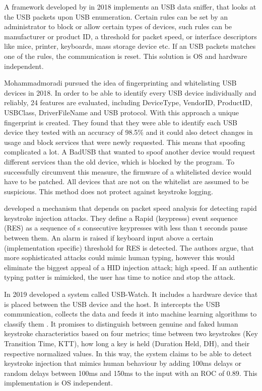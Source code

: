 A framework developed by \cite{erdinOSIndependentHardwareAssisted2018} in 2018 implements an USB data sniffer, that looks at the USB packets upon USB enumeration. Certain rules can be set by an administrator to block or allow certain types of devices, such rules can be manufacturer or product ID, a threshold for packet speed, or interface descriptors like mice, printer, keyboards, mass storage device etc. If an USB packets matches one of the rules, the communication is reset. This solution is OS and hardware independent. 

Mohammadmoradi \cite{mohammadmoradiMakingWhitelistingBasedDefense2018} pursued the idea of fingerprinting and whitelisting USB devices in 2018. In order to be able to identify every USB device individually and reliably, 24 features are evaluated, including DeviceType, VendorID, ProductID, USBClass, DriverFileName and USB protocol. With this approach a unique fingerprint is created. They found that they were able to identify each USB device they tested with an accuracy of 98.5\% and it could also detect changes in usage and block services that were newly requested. This means that spoofing complicated a lot. A BadUSB that wanted to spoof another device would request different services than the old device, which is blocked by the program. To successfully circumvent this measure, the firmware of a whitelisted device would have to be patched. All devices that are not on the whitelist are assumed to be suspicious. This method does not protect against keystroke logging. 

\cite{neunerUSBlockBlockingUSBBased2018} developed a mechanism that depends on packet speed analysis for detecting rapid keystroke injection attacks. They define a Rapid (keypresss) event sequence (RES) as a sequence of s consecutive keypresses with less than t seconds pause between them. An alarm is raised if keyboard input above a certain (implementation specific) threshold for RES is detected. The authors argue, that more sophisticated attacks could mimic human typing, however this would eliminate the biggest appeal of a HID injection attack; high speed. If an authentic typing patter is mimicked, the user has time to notice and stop the attack.

In 2019 \cite{denneyUSBWatchDynamicHardwareAssisted2019} developed a system called USB-Watch. It includes a hardware device that is placed between the USB device and the host. It intercepts the USB communication, collects the data and feeds it into machine learning algorithms to classify them . It promises to distinguish between genuine and faked human keystroke characteristics based on four metrics; time between two keystrokes (Key Transition Time, KTT), how long a key is held (Duration Held, DH), and their respective normalized values. In this way, the system claims to be able to detect keystroke injection that mimics human behaviour by adding 100ms delays or random delays between 100ms and 150ms to the input with an ROC of 0.89. This implementation is OS independent.

